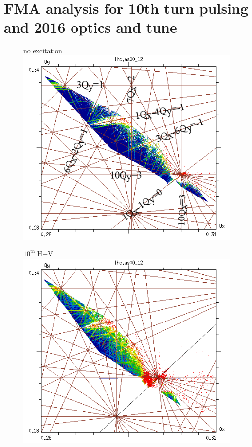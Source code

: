 \documentclass[%
 reprint,
 amsmath,amssymb,
 aps,
prstab,
]{revtex4-1}
\begin{document}
\section{FMA analysis for 10th turn pulsing and 2016 optics and tune}
\label{app:sec:fma:10}
\begin{figure}[h]
	\begin{minipage}[t]{0.49\linewidth}
		\centering
		no excitation
		\includegraphics[width=1.0\linewidth]{2016injnocolc15o+19_6noerru_dp0_ord10_annotate.png}
	\end{minipage}
	\begin{minipage}[t]{0.49\linewidth}
		\centering
		$10^{\mathrm{th}}$ H+V
		\includegraphics[width=1.0\linewidth]{2016injnocolc15o+19_6noerrut10skhv_dp0_ord10.png}

\end{minipage}
\end{figure}
\end{document}
